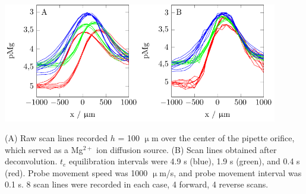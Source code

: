 \documentclass{beamer}
\begin{document}
\begin{frame}
\centering
\includegraphics[width=0.45\textwidth]{phd-figure22.pdf}\hfill \includegraphics[width=0.45\textwidth]{phd-figure23.pdf}

\vfill

(A) Raw scan lines recorded $h$ = 100 $\upmu$m over the center of the pipette orifice, which served as a Mg$^{2+}$ ion diffusion source.
(B) Scan lines obtained after deconvolution.
$t_e$ equilibration intervals were 4.9 s (blue), 1.9 s (green), and 0.4 s (red).
Probe movement speed was 1000 $\upmu$m/s, and probe movement interval was 0.1 s.
8 scan lines were recorded in each case, 4 forward, 4 reverse scans.
\end{frame}
\end{document}
